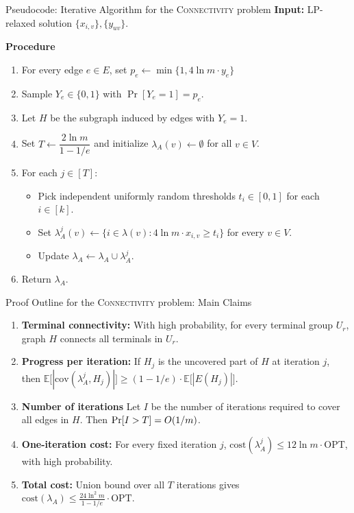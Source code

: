 \documentclass[aspectratio=169]{beamer}
\newcommand{\connectivity}{\textsc{Connectivity}\xspace}
\newcommand{\OPT}{\mathrm{OPT}}
\begin{document}
\begin{frame}{Pseudocode: Iterative Algorithm for the \connectivity problem}
  \textbf{Input:} LP-relaxed solution $\{x_{i,v}\},\{y_{uv}\}$.

  \vspace{0.4em}
  \textbf{Procedure}
  \begin{enumerate}
    \item For every edge $e\in E$, set $p_e\gets\min\{1,4\ln m\cdot y_e\}$
    \pause
    \item Sample $Y_e\in\{0,1\}$ with $\Pr[Y_e=1]=p_e$.
    \pause
    \item Let $H$ be the subgraph induced by edges with $Y_e=1$.
    \pause
    \item Set $T\gets \dfrac{2\ln m}{1-1/e}$ and initialize $\lambda_A(v)\gets\emptyset$ for all $v\in V$.
    \pause
    \item For each $j\in[T]$:
    \begin{itemize}
      \item Pick independent uniformly random thresholds $t_i\in[0,1]$ for each $i\in[k]$.
      \pause
      \item Set $\lambda_A^j(v)\gets\{i\in\lambda(v): 4\ln m\cdot x_{i,v}\ge t_i\}$ for every $v\in V$.
      \pause
      \item Update $\lambda_A\gets\lambda_A\cup\lambda_A^j$.
    \end{itemize}
    \pause
    \item Return $\lambda_A$.
  \end{enumerate}
\end{frame}

\begin{frame}{Proof Outline for the \connectivity problem: Main Claims}
  \begin{enumerate}
    \item \textbf{Terminal connectivity:} With high probability, for every terminal group $U_r$, graph $H$ connects all terminals in $U_r$.
    \pause
    \item \textbf{Progress per iteration:} If $H_j$ is the uncovered part of $H$ at iteration $j$, then $
      \mathbb{E}\big[|\mathrm{cov}(\lambda_A^j,H_j)|\big]
      \ge (1-1/e)\cdot \mathbb{E}\big[|E(H_j)|\big].$
    \pause
    \item \textbf{Number of iterations} Let $I$ be the number of iterations required to cover all edges in $H$. Then $\Pr[I > T]= O\mathopen{}\left( 1/m \right)$.
    \pause
    \item \textbf{One-iteration cost:} For every fixed iteration $j$, $\mathrm{cost}(\lambda_A^j)\le 12\ln m\cdot \OPT$, with high probability.
    \pause
    \item \textbf{Total cost:} Union bound over all $T$ iterations gives $
      \mathrm{cost}(\lambda_A)\le \frac{24\ln^2 m}{1-1/e}\cdot \OPT.$
  \end{enumerate}
\end{frame}
\end{document}
